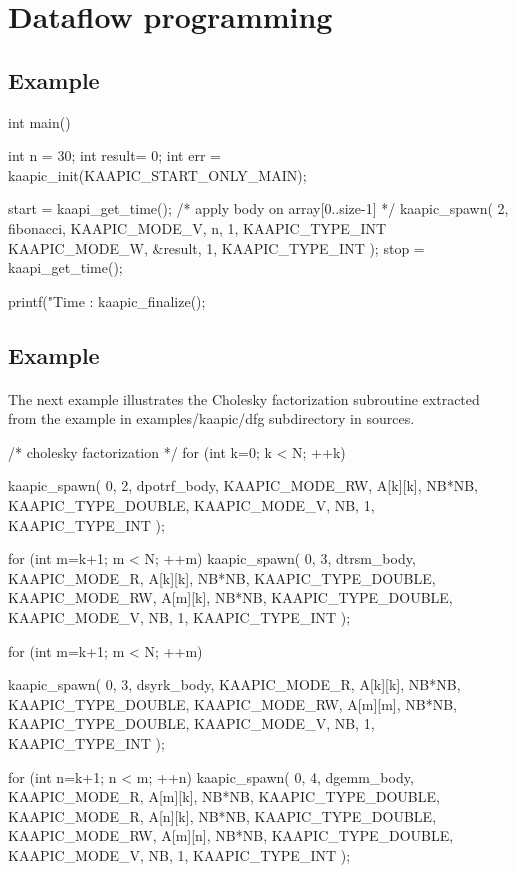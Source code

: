 \documentclass[a4paper, 11pt]{article}
\makeatletter
\newenvironment{apisection}[2][noshortnameprovided]{%
  \newpage
  \section{#2}
  \label{api@#1}
  \newcommand{\api@newpart}[4][noshortpartnameprovided]{%
    \newenvironment{##1}{%
      \subsection{##2}%
      \label{api@#1@##1}%
      ##3%
    }{##4}%
  }%
  \api@newpart[synopsis]{Synopsis}{}{}%
  \api@newpart[call]{Call}{}{}%
  \api@newpart[desc]{Description}{}{}%
  \api@newpart[params]{Parameters}{%
    \let\api@indesc\@empty
    \newcommand{\param}[1]{%
      \def\api@indesc{yes}%
      \begin{description}%
        \renewcommand{\param}[1]{\item[########1]}%
      \item[####1]
      }%
      \newenvironment{parameters}{%
        \begin{description}%
          \renewcommand{\param}[1]{\item[########1]}%
        }{%
        \end{description}%
      }
    }{%
      \ifx\api@indesc\@empty\relax\else%
    \end{description}%
    \fi%
  }%
  \api@newpart[ret]{Return value}{%
    \newcommand{\otherret}{\par\medskip\noindent}%
  }{}%
  \api@newpart[example]{Example}{}{}%
}{}
\makeatother
\begin{document}
\begin{apisection}[dataflow]{Dataflow programming}
\begin{example}
\begin{code}
  int main()
  {
    int n = 30;
    int result= 0;
    int err = kaapic_init(KAAPIC_START_ONLY_MAIN);

    start = kaapi_get_time(); 
    /* apply body on array[0..size-1] */
    kaapic_spawn( 2, fibonacci, 
        KAAPIC_MODE_V, n, 1, KAAPIC_TYPE_INT
        KAAPIC_MODE_W, &result, 1,  KAAPIC_TYPE_INT
    );
    stop = kaapi_get_time(); 

    printf("Time : %
    kaapic_finalize();
  }
    \end{code}
  \end{example}
\pagebreak
  \begin{example}\label{fibo}
    \paragraph{}
    The next example illustrates the Cholesky factorization subroutine extracted from the example in examples/kaapic/dfg subdirectory in sources.\\
  \begin{code}
    /* cholesky factorization */
    for (int k=0; k < N; ++k)
    {
      kaapic_spawn( 0, 2, dpotrf_body, 
      	KAAPIC_MODE_RW, A[k][k], NB*NB, KAAPIC_TYPE_DOUBLE,
	KAAPIC_MODE_V, NB, 1, KAAPIC_TYPE_INT
      );

      for (int m=k+1; m < N; ++m)
        kaapic_spawn( 0, 3, dtrsm_body, 
          KAAPIC_MODE_R,  A[k][k], NB*NB, KAAPIC_TYPE_DOUBLE,
          KAAPIC_MODE_RW, A[m][k], NB*NB, KAAPIC_TYPE_DOUBLE,
          KAAPIC_MODE_V, NB, 1, KAAPIC_TYPE_INT
        );

      for (int m=k+1; m < N; ++m)
      {
        kaapic_spawn( 0, 3, dsyrk_body,
          KAAPIC_MODE_R,  A[k][k], NB*NB, KAAPIC_TYPE_DOUBLE,
          KAAPIC_MODE_RW, A[m][m], NB*NB, KAAPIC_TYPE_DOUBLE, 
          KAAPIC_MODE_V, NB, 1, KAAPIC_TYPE_INT
        );

        for (int n=k+1; n < m; ++n)
        {
          kaapic_spawn( 0, 4, dgemm_body,
            KAAPIC_MODE_R,  A[m][k], NB*NB, KAAPIC_TYPE_DOUBLE,
            KAAPIC_MODE_R, A[n][k], NB*NB, KAAPIC_TYPE_DOUBLE, 
            KAAPIC_MODE_RW, A[m][n], NB*NB, KAAPIC_TYPE_DOUBLE, 
            KAAPIC_MODE_V, NB, 1, KAAPIC_TYPE_INT
          );
        }
      }
    }
  \end{code}
  \end{example}
\end{apisection}
\end{document}
